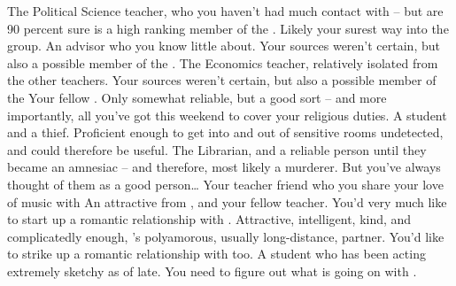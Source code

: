 \documentclass[char]{GL2020}
\begin{document}
\begin{itemz}[Notes]
	\item 
\end{itemz}

\begin{contacts}
	\contact{\cChupInventor{}} The Political Science teacher, who you haven’t had much contact with -- but are 90 percent sure is a high ranking member of the \pGoaties{}. Likely your surest way into the group.
\contact{\cWildCard{}} An advisor who you know little about. Your sources weren’t certain, but also a possible member of the \pGoaties{}. 
	\contact{\cChupSecond{}} The Economics teacher, relatively isolated from the other teachers. Your sources weren’t certain, but also a possible member of the \pGoaties{}
	\contact{\cHedonist{}} Your fellow \pFarm{} \cHedonist{\cleric}. Only somewhat reliable, but a good sort -- and more importantly, all you’ve got this weekend to cover your religious duties. 
	\contact{\cPirateChild{}} A student and a thief. Proficient enough to get into and out of sensitive rooms undetected, and could therefore be useful.  
	\contact{\cLibrarian{}} The Librarian, and a reliable person until they became an amnesiac -- and therefore, most likely a murderer. But you’ve always thought of them as a good person\ldots 
	\contact{\cMusic{}} Your teacher friend who you share your love of music with 
\contact{\cBeetle{}} An attractive \cBeetle{\cleric} from \pTech{}, and your fellow teacher. You’d very much like to start up a romantic relationship with \cBeetle{\them}.
	\contact{\cJuniorStatesman{}} Attractive, intelligent, kind, and complicatedly enough, \cBeetle{}’s polyamorous, usually long-distance, partner. You’d like to strike up a romantic relationship with \cJuniorStatesman{\them} too.
	\contact{\cLibAssist{}} A \pFarm{} student who has been acting extremely sketchy as of late. You need to figure out what is going on with \cLibAssist{\them}.
\end{contacts}
\end{document}
